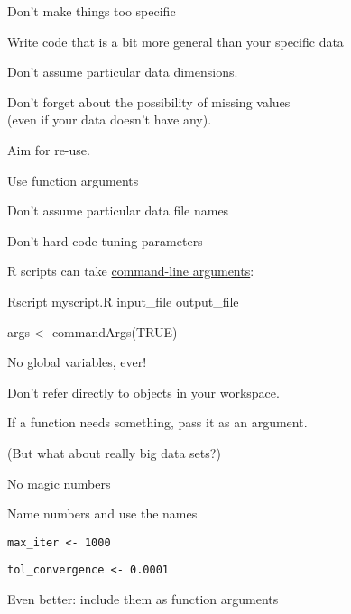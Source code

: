 \documentclass[12pt,t]{beamer}
\begin{document}
\begin{frame}{Don't make things too specific}

\bbi
\item Write code that is a bit more general than your specific data
  \bi
  \item Don't assume particular data dimensions.
  \item Don't forget about the possibility of missing values\\
    (even if {\hilit your} data doesn't have any).
  \item Aim for re-use.
  \ei
\item Use function arguments
  \bi
  \item Don't assume particular data file names
  \item Don't hard-code tuning parameters
  \item R scripts can take \href{http://stackoverflow.com/questions/2151212/how-can-i-read-command-line-parameters-from-an-r-script}{command-line arguments}:\\[2pt]
    \bi
    \item[] {\ttsm Rscript myscript.R input\_file output\_file} \\[2pt]
    \item[] {\ttsm args <- commandArgs(TRUE)}
    \ei
  \ei
\ei

\end{frame}



\begin{frame}{No global variables, ever!}

\bbi
\item Don't refer directly to objects in your workspace.
\item If a function needs something, pass it as an argument.
\item (But what about really big data sets?)
\ei

\end{frame}



\begin{frame}{No magic numbers}

\bbi
\item Name numbers and use the names
  \bi
  \item[] {\tt max\_iter <- 1000}
  \item[] {\tt tol\_convergence <- 0.0001}
  \ei
\item {\hilit Even better}: include them as function arguments
\ei

\end{frame}
\end{document}
